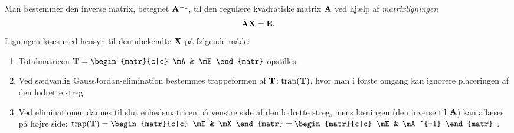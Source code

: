 \begin{method} \label{tn4.findinvers}
Man bestemmer den inverse matrix, betegnet $ \mathbf{A}^{-1} $, til den regulære kvadratiske matrix $ \mathbf{A} $ ved hjælp af \textit{matrixligningen}
\begin{equation}
\mathbf{A}\mathbf{X} = \mathbf{E}.
\end{equation}
Ligningen løses med hensyn til den ubekendte $ \mathbf{X} $ på følgende måde:
\begin{enumerate}
\item Totalmatricen $ \mT = \begin{matr}{c|c} \mA & \mE \end{matr} $ opstilles.
\item Ved sædvanlig GaussJordan-elimination bestemmes trappeformen af $ \mathbf{T} $: $ \mathrm{trap}(\mathbf{T}) $, hvor man i første omgang kan ignorere placeringen af den lodrette streg.
\item Ved eliminationen dannes til slut enhedsmatricen på venstre side af den lodrette streg, mens løsningen (den inverse til $ \mathbf{A} $) kan aflæses på højre side: $ \trap{\mT} = \begin{matr}{c|c} \mE & \mX \end{matr} = \begin{matr}{c|c} \mE & \mA^{-1} \end{matr} $ .
\end{enumerate}
\end{method}

